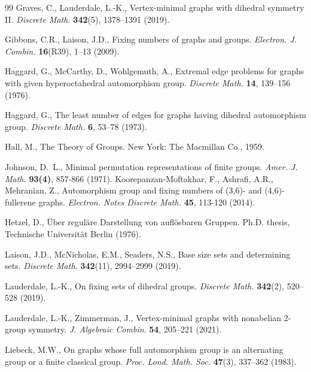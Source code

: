 \documentclass[12pt]{article}
\theoremstyle{plain}
\theoremstyle{definition}
\begin{document}
\begin{thebibliography}{99}
		Graves, C., Lauderdale, L.-K., Vertex-minimal graphs with dihedral symmetry II.
		\textit{Discrete Math.} \textbf{342}(5), 1378–1391 (2019).		
		
		Gibbons, C.R., Laison, J.D., Fixing numbers of graphs and groups.
		\textit{Electron. J. Combin.} \textbf{16}(R39), 1–13 (2009).
		
		
		
		
		Haggard, G., McCarthy, D., Wohlgemuth, A., Extremal edge problems for graphs with given hyperoctahedral automorphism group.
		\textit{Discrete Math.} \textbf{14}, 139–156 (1976).
		
		Haggard, G., The least number of edges for graphs having dihedral automorphism group. \textit{Discrete Math.} \textbf{6}, 53–78 (1973).
		
		
		Hall, M., The Theory of Groups. New York: The Macmillan Co., 1959.
		
		Johnson, D.~L., Minimal permutation representations of finite groups. \textit{Amer. J. Math.} \textbf{93(4)},  857-866 (1971).
		Koorepanzan-Moftakhar, F., Ashrafi, A.R., Mehranian, Z., Automorphism group and fixing numbers of (3,6)- and (4,6)-fullerene graphs. \textit{Electron. Notes Discrete Math.} \textbf{45}, 113-120 (2014).
		
		Hetzel, D., Über reguläre Darstellung von auflösbaren Gruppen. Ph.D. thesis, Technische Universität Berlin (1976).
		
		Laison, J.D., McNicholas, E.M., Seaders, N.S., Base size sets and determining sets. \textit{Discrete Math.} \textbf{342}(11), 2994--2999 (2019).
		
		
		Lauderdale, L.-K., On fixing sets of dihedral groups.
		\textit{ Discrete Math.} \textbf{342}(2), 520–528 (2019).
		
		
		Lauderdale, L.-K., Zimmerman, J., Vertex-minimal graphs with nonabelian 2-group symmetry.\textit{ J. Algebraic Combin}. \textbf{54}, 205–221 (2021).
		
		Liebeck, M.W., On graphs whose full automorphism group is an alternating group or a finite classical group.
		\textit{Proc. Lond. Math. Soc.} \textbf{47}(3), 337–362 (1983).
		

\end{thebibliography}
\end{document}
